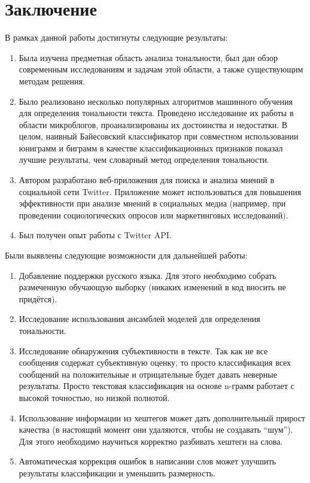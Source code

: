 \section*{Заключение}

В рамках данной работы достигнуты следующие результаты:

\begin{enumerate}

\item
Была изучена предметная область анализа тональности,
был дан обзор современным исследованиям и задачам этой области,
а также существующим методам решения.

\item
Было реализовано несколько популярных алгоритмов машинного обучения 
для определения тональности текста. 
Проведено исследование их работы в области
микроблогов, проанализированы их достоинства и недостатки.
В целом, наивный Байесовский классификатор при
совместном использовании юниграмм
и биграмм в качестве классификационных признаков
показал лучшие результаты, чем словарный метод определения тональности.

\item
Автором разработано веб-приложения для поиска и анализа мнений
в социальной сети Twitter. Приложение может использоваться для
повышения эффективности при анализе мнений в социальных медиа 
(например, при проведении социологических опросов или маркетинговых исследований).

\item
Был получен опыт работы с Twitter API.

\end{enumerate}

Были выявлены следующие возможности для дальнейшей работы:
\begin{enumerate}

\item
Добавление поддержки русского языка. Для этого необходимо собрать размеченную обучающую выборку (никаких изменений в код вносить не придётся).

\item
Исследование использования ансамблей моделей для определения тональности.

\item
Исследование обнаружения субъективности в тексте. Так как не все сообщения
содержат субъективную оценку, то просто классификация всех сообщений
на положительные и отрицательные будет давать неверные результаты.
Просто текстовая классификация на основе n-грамм работает с высокой точностью,
но низкой полнотой.

\item
Использование информации из хештегов может дать дополнительный прирост 
качества (в настоящий момент они удаляются, чтобы не создавать ``шум''). 
Для этого необходимо научиться корректно разбивать хештеги на слова.

\item
Автоматическая коррекция ошибок в написании слов может улучшить результаты классификации и уменьшить размерность.

\end{enumerate}